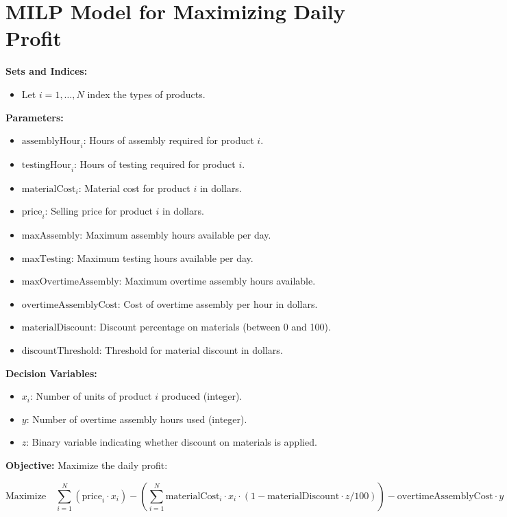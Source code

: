 \documentclass{article}
\begin{document}
\section*{MILP Model for Maximizing Daily Profit}

\textbf{Sets and Indices:}
\begin{itemize}
    \item Let \( i = 1, \ldots, N \) index the types of products.
\end{itemize}

\textbf{Parameters:}
\begin{itemize}
    \item \( \text{assemblyHour}_i \): Hours of assembly required for product \( i \).
    \item \( \text{testingHour}_i \): Hours of testing required for product \( i \).
    \item \( \text{materialCost}_i \): Material cost for product \( i \) in dollars.
    \item \( \text{price}_i \): Selling price for product \( i \) in dollars.
    \item \( \text{maxAssembly} \): Maximum assembly hours available per day.
    \item \( \text{maxTesting} \): Maximum testing hours available per day.
    \item \( \text{maxOvertimeAssembly} \): Maximum overtime assembly hours available.
    \item \( \text{overtimeAssemblyCost} \): Cost of overtime assembly per hour in dollars.
    \item \( \text{materialDiscount} \): Discount percentage on materials (between 0 and 100).
    \item \( \text{discountThreshold} \): Threshold for material discount in dollars.
\end{itemize}

\textbf{Decision Variables:}
\begin{itemize}
    \item \( x_i \): Number of units of product \( i \) produced (integer).
    \item \( y \): Number of overtime assembly hours used (integer).
    \item \( z \): Binary variable indicating whether discount on materials is applied.
\end{itemize}

\textbf{Objective:}
Maximize the daily profit:

\[
\text{Maximize} \quad \sum_{i=1}^{N} \left( \text{price}_i \cdot x_i \right) - \left( \sum_{i=1}^{N} \text{materialCost}_i \cdot x_i \cdot (1 - \text{materialDiscount} \cdot z / 100) \right) - \text{overtimeAssemblyCost} \cdot y
\]
\end{document}
